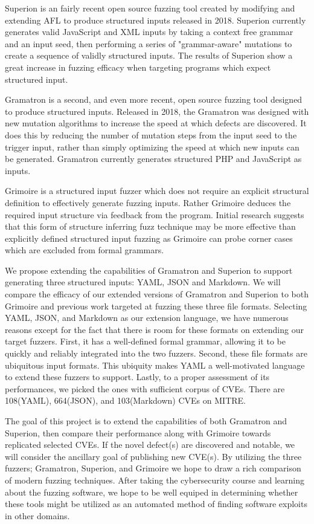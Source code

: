 \documentclass[12pt]{diazessay}
\begin{document}
Superion\cite{superion} is an fairly recent open source fuzzing tool created by modifying and extending AFL to produce structured inputs released in 2018.
Superion currently generates valid JavaScript and XML inputs by taking a context free grammar and an input seed, then performing a series of "grammar-aware" mutations to create a sequence of validly structured inputs.
The results of Superion show a great increase in fuzzing efficacy when targeting programs which expect structured input.

Gramatron\cite{srivastava2021gramatron} is a second, and even more recent, open source fuzzing tool designed to produce structured inputs.
Released in 2018, the Gramatron was designed with new mutation algorithms to increase the speed at which defects are discovered.
It does this by reducing the number of mutation steps from the input seed to the trigger input, rather than simply optimizing the speed at which new inputs can be generated.
Gramatron currently generates structured PHP and JavaScript as inputs.

Grimoire\cite{GRIMOIRE} is a structured input fuzzer which does not require an explicit structural definition to effectively generate fuzzing inputs.
Rather Grimoire deduces the required input structure via feedback from the program.
Initial research suggests that this form of structure inferring fuzz technique may be more effective than explicitly defined structured input fuzzing as Grimoire can probe corner cases which are excluded from formal grammars.

We propose extending the capabilities of Gramatron and Superion to support generating three structured inputs: YAML\cite{YAMLdraft}, JSON and Markdown.
We will compare the efficacy of our extended versions of Gramatron and Superion to both Grimoire and previous work targeted at fuzzing these three file formats.
Selecting YAML, JSON, and Markdown as our extension language, we have numerous reasons except for the fact that there is room for these formats on extending our target fuzzers.
First, it has a well-defined formal grammar, allowing it to be quickly and reliably integrated into the two fuzzers.
Second, these file formats are ubiquitous input formats.
This ubiquity makes YAML a well-motivated language to extend these fuzzers to support.
Lastly, to a proper assessment of its performances, we picked the ones with sufficient corpus of CVEs.
There are 108(YAML), 664(JSON), and 103(Markdown) CVEs on MITRE\cite{MITRE}.

The goal of this project is to extend the capabilities of both Gramatron and Superion, then compare their performance along with Grimoire towards replicated selected CVEs.
If the novel defect(s) are discovered and notable, we will consider the ancillary goal of publishing new CVE(s).
By utilizing the three fuzzers; Gramatron, Superion, and Grimoire we hope to draw a rich comparison of modern fuzzing techniques.
After taking the cybersecurity course and learning about the fuzzing software, we hope to be well equiped in determining whether these tools might be utilized as an automated method of finding software exploits in other domains.
\end{document}
